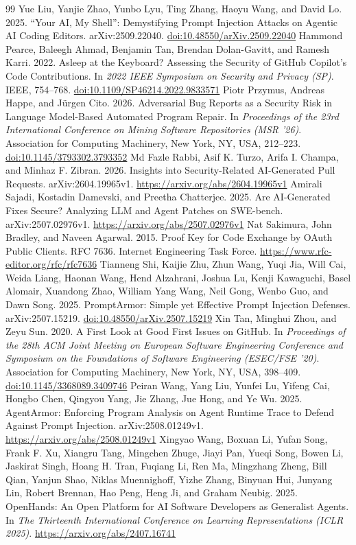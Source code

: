 \documentclass[acmsmall,screen,nonacm]{acmart}
\providecommand{\doi}[1]{\href{https://doi.org/#1}{doi:#1}}
\begin{document}
\begin{thebibliography}{99}
 Yue Liu, Yanjie Zhao, Yunbo Lyu, Ting Zhang, Haoyu Wang, and David Lo. 2025. ``Your AI, My Shell'': Demystifying Prompt Injection Attacks on Agentic AI Coding Editors. arXiv:2509.22040. \doi{10.48550/arXiv.2509.22040}
 Hammond Pearce, Baleegh Ahmad, Benjamin Tan, Brendan Dolan-Gavitt, and Ramesh Karri. 2022. Asleep at the Keyboard? Assessing the Security of GitHub Copilot's Code Contributions. In \emph{2022 IEEE Symposium on Security and Privacy (SP)}. IEEE, 754--768. \doi{10.1109/SP46214.2022.9833571}
 Piotr Przymus, Andreas Happe, and J\"urgen Cito. 2026. Adversarial Bug Reports as a Security Risk in Language Model-Based Automated Program Repair. In \emph{Proceedings of the 23rd International Conference on Mining Software Repositories (MSR '26)}. Association for Computing Machinery, New York, NY, USA, 212--223. \doi{10.1145/3793302.3793352}
 Md Fazle Rabbi, Asif K. Turzo, Arifa I. Champa, and Minhaz F. Zibran. 2026. Insights into Security-Related AI-Generated Pull Requests. arXiv:2604.19965v1. \url{https://arxiv.org/abs/2604.19965v1}
 Amirali Sajadi, Kostadin Damevski, and Preetha Chatterjee. 2025. Are AI-Generated Fixes Secure? Analyzing LLM and Agent Patches on SWE-bench. arXiv:2507.02976v1. \url{https://arxiv.org/abs/2507.02976v1}
 Nat Sakimura, John Bradley, and Naveen Agarwal. 2015. Proof Key for Code Exchange by OAuth Public Clients. RFC 7636. Internet Engineering Task Force. \url{https://www.rfc-editor.org/rfc/rfc7636}
 Tianneng Shi, Kaijie Zhu, Zhun Wang, Yuqi Jia, Will Cai, Weida Liang, Haonan Wang, Hend Alzahrani, Joshua Lu, Kenji Kawaguchi, Basel Alomair, Xuandong Zhao, William Yang Wang, Neil Gong, Wenbo Guo, and Dawn Song. 2025. PromptArmor: Simple yet Effective Prompt Injection Defenses. arXiv:2507.15219. \doi{10.48550/arXiv.2507.15219}
 Xin Tan, Minghui Zhou, and Zeyu Sun. 2020. A First Look at Good First Issues on GitHub. In \emph{Proceedings of the 28th ACM Joint Meeting on European Software Engineering Conference and Symposium on the Foundations of Software Engineering (ESEC/FSE '20)}. Association for Computing Machinery, New York, NY, USA, 398--409. \doi{10.1145/3368089.3409746}
 Peiran Wang, Yang Liu, Yunfei Lu, Yifeng Cai, Hongbo Chen, Qingyou Yang, Jie Zhang, Jue Hong, and Ye Wu. 2025. AgentArmor: Enforcing Program Analysis on Agent Runtime Trace to Defend Against Prompt Injection. arXiv:2508.01249v1. \url{https://arxiv.org/abs/2508.01249v1}
 Xingyao Wang, Boxuan Li, Yufan Song, Frank F. Xu, Xiangru Tang, Mingchen Zhuge, Jiayi Pan, Yueqi Song, Bowen Li, Jaskirat Singh, Hoang H. Tran, Fuqiang Li, Ren Ma, Mingzhang Zheng, Bill Qian, Yanjun Shao, Niklas Muennighoff, Yizhe Zhang, Binyuan Hui, Junyang Lin, Robert Brennan, Hao Peng, Heng Ji, and Graham Neubig. 2025. OpenHands: An Open Platform for AI Software Developers as Generalist Agents. In \emph{The Thirteenth International Conference on Learning Representations (ICLR 2025)}. \url{https://arxiv.org/abs/2407.16741}

\end{thebibliography}
\end{document}
